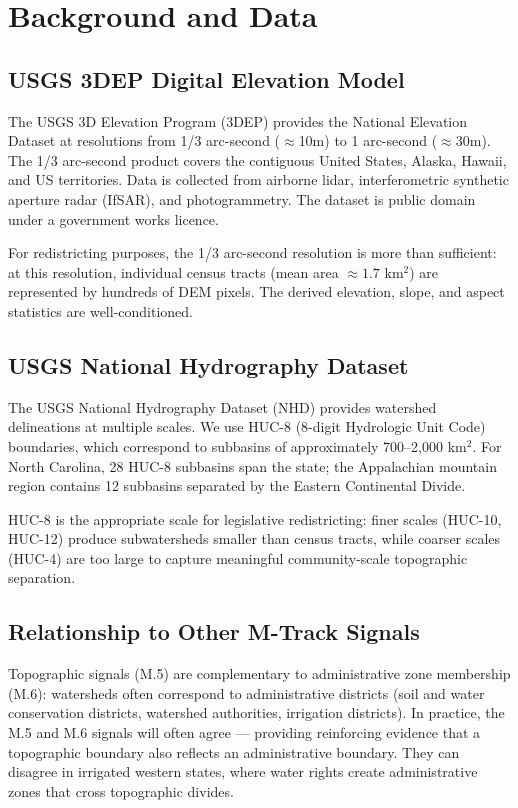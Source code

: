 \section{Background and Data}

\subsection{USGS 3DEP Digital Elevation Model}

The USGS 3D Elevation Program (3DEP) provides the National Elevation Dataset at resolutions from 1/3 arc-second ($\approx$10m) to 1 arc-second ($\approx$30m). The 1/3 arc-second product covers the contiguous United States, Alaska, Hawaii, and US territories. Data is collected from airborne lidar, interferometric synthetic aperture radar (IfSAR), and photogrammetry. The dataset is public domain under a government works licence.

For redistricting purposes, the 1/3 arc-second resolution is more than sufficient: at this resolution, individual census tracts (mean area $\approx 1.7$ km$^2$) are represented by hundreds of DEM pixels. The derived elevation, slope, and aspect statistics are well-conditioned.

\subsection{USGS National Hydrography Dataset}

The USGS National Hydrography Dataset (NHD) provides watershed delineations at multiple scales. We use HUC-8 (8-digit Hydrologic Unit Code) boundaries, which correspond to subbasins of approximately 700--2{,}000 km$^2$. For North Carolina, 28 HUC-8 subbasins span the state; the Appalachian mountain region contains 12 subbasins separated by the Eastern Continental Divide.

HUC-8 is the appropriate scale for legislative redistricting: finer scales (HUC-10, HUC-12) produce subwatersheds smaller than census tracts, while coarser scales (HUC-4) are too large to capture meaningful community-scale topographic separation.

\subsection{Relationship to Other M-Track Signals}

Topographic signals (M.5) are complementary to administrative zone membership (M.6): watersheds often correspond to administrative districts (soil and water conservation districts, watershed authorities, irrigation districts). In practice, the M.5 and M.6 signals will often agree — providing reinforcing evidence that a topographic boundary also reflects an administrative boundary. They can disagree in irrigated western states, where water rights create administrative zones that cross topographic divides.
